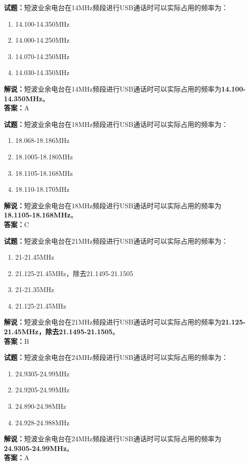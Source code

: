 \documentclass{ctexbook}
\begin{document}
\bigskip

\noindent\textbf{试题：}短波业余电台在14\unit{\MHz}频段进行USB通话时可以实际占用的频率为：
\begin{enumerate}[leftmargin=3em]
  \item 14.100-14.350\unit{\MHz}
  \item 14.000-14.250\unit{\MHz}
  \item 14.070-14.250\unit{\MHz}
  \item 14.030-14.350\unit{\MHz}
\end{enumerate}
\noindent\textbf{解说：}短波业余电台在14\unit{\MHz}频段进行USB通话时可以实际占用的频率为\textbf{14.100-14.350\unit{\MHz}}。\\\noindent\textbf{答案：}A

\bigskip

\noindent\textbf{试题：}短波业余电台在18\unit{\MHz}频段进行USB通话时可以实际占用的频率为：
\begin{enumerate}[leftmargin=3em]
  \item 18.068-18.186\unit{\MHz}
  \item 18.1005-18.180\unit{\MHz}
  \item 18.1105-18.168\unit{\MHz}
  \item 18.110-18.170\unit{\MHz}
\end{enumerate}
\noindent\textbf{解说：}短波业余电台在18\unit{\MHz}频段进行USB通话时可以实际占用的频率为\textbf{18.1105-18.168\unit{\MHz}}。\\\noindent\textbf{答案：}C

\bigskip

\noindent\textbf{试题：}短波业余电台在21\unit{\MHz}频段进行USB通话时可以实际占用的频率为：
\begin{enumerate}[leftmargin=3em]
  \item 21-21.45\unit{\MHz}
  \item 21.125-21.45\unit{\MHz}，除去21.1495-21.1505
  \item 21-21.35\unit{\MHz}
  \item 21.125-21.45\unit{\MHz}
\end{enumerate}
\noindent\textbf{解说：}短波业余电台在21\unit{\MHz}频段进行USB通话时可以实际占用的频率为\textbf{21.125-21.45\unit{\MHz}，除去21.1495-21.1505}。\\\noindent\textbf{答案：}B

\bigskip

\noindent\textbf{试题：}短波业余电台在24\unit{\MHz}频段进行USB通话时可以实际占用的频率为：
\begin{enumerate}[leftmargin=3em]
  \item 24.9305-24.99\unit{\MHz}
  \item 24.9205-24.99\unit{\MHz}
  \item 24.890-24.98\unit{\MHz}
  \item 24.928-24.988\unit{\MHz}
\end{enumerate}
\noindent\textbf{解说：}短波业余电台在24\unit{\MHz}频段进行USB通话时可以实际占用的频率为\textbf{24.9305-24.99\unit{\MHz}}。\\\noindent\textbf{答案：}A
\end{document}
